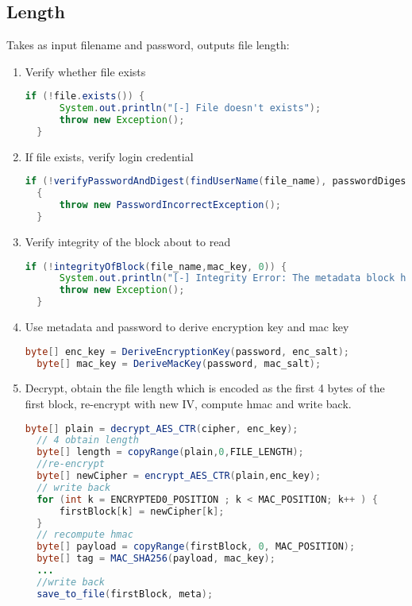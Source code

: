 \documentclass[a4paper,10pt]{article}
\begin{document}
\subsection{Length} %
\label{sub:length}
Takes as input filename and password, outputs file length:
\begin{enumerate}
  \item Verify whether file exists
  \begin{lstlisting}[linewidth=.5\columnwidth,breaklines=true,language=Java]
  if (!file.exists()) {
      System.out.println("[-] File doesn't exists");
      throw new Exception();
  }\end{lstlisting}
  \item If file exists, verify login credential 
  \begin{lstlisting}[linewidth=\columnwidth,breaklines=true,language=Java]
  if (!verifyPasswordAndDigest(findUserName(file_name), passwordDigest, passwd_salt, password))
  {
      throw new PasswordIncorrectException();    
  }\end{lstlisting}
  \item Verify integrity of the block about to read
  \begin{lstlisting}[linewidth=\columnwidth,breaklines=true,language=Java]
  if (!integrityOfBlock(file_name,mac_key, 0)) {
      System.out.println("[-] Integrity Error: The metadata block has been modified");
      throw new Exception();
  }\end{lstlisting}
  \item Use metadata and password to derive encryption key and mac key
  \begin{lstlisting}[linewidth=.5\columnwidth,breaklines=true,language=Java]
  byte[] enc_key = DeriveEncryptionKey(password, enc_salt);
  byte[] mac_key = DeriveMacKey(password, mac_salt);\end{lstlisting}
  \item Decrypt, obtain the file length which is encoded as the first 4 bytes of the first block, re-encrypt with new IV, compute hmac and write back.
  \begin{lstlisting}[linewidth=\columnwidth,breaklines=true,language=Java]
  byte[] plain = decrypt_AES_CTR(cipher, enc_key);
  // 4 obtain length
  byte[] length = copyRange(plain,0,FILE_LENGTH);
  //re-encrypt
  byte[] newCipher = encrypt_AES_CTR(plain,enc_key);
  // write back
  for (int k = ENCRYPTED0_POSITION ; k < MAC_POSITION; k++ ) {
      firstBlock[k] = newCipher[k];
  }
  // recompute hmac
  byte[] payload = copyRange(firstBlock, 0, MAC_POSITION);
  byte[] tag = MAC_SHA256(payload, mac_key);
  ...
  //write back
  save_to_file(firstBlock, meta);\end{lstlisting}
\end{enumerate}
\end{document}
